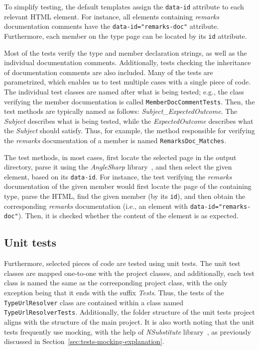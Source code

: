To simplify testing, the default templates assign the \texttt{data-id} attribute to each relevant HTML element.
For instance, all elements containing \textit{remarks} documentation comments have the \texttt{data-id="remarks-doc"} attribute.
Furthermore, each member on the type page can be located by its \texttt{id} attribute.

Most of the tests verify the type and member declaration strings, as well as the individual documentation comments.
Additionally, tests checking the inheritance of documentation comments are also included.
Many of the tests are parametrized, which enables us to test multiple cases with a single piece of code.
The individual test classes are named after what is being tested; e.g., the class verifying the member documentation is called \texttt{MemberDocCommentTests}.
Then, the test methods are typically named as follows: \textit{Subject\_ExpectedOutcome}.
The \textit{Subject} describes what is being tested, while the \textit{ExpectedOutcome} describes what the \textit{Subject} should satisfy.
Thus, for example, the method responsible for verifying the \textit{remarks} documentation of a member is named \texttt{RemarksDoc\_Matches}.

The test methods, in most cases, first locate the selected page in the output directory, parse it using the \textit{AngleSharp} library~\cite{anglesharp}, and then select the given element, based on its \texttt{data-id}.
For instance, the test verifying the \textit{remarks} documentation of the given member would first locate the page of the containing type, parse the HTML, find the given member (by its \texttt{id}), and then obtain the corresponding \textit{remarks} documentation (i.e., an element with \texttt{data-id="remarks-doc"}).
Then, it is checked whether the content of the element is as expected.

\subsection{Unit tests}

Furthermore, selected pieces of code are tested using unit tests.
The unit test classes are mapped one-to-one with the project classes, and additionally, each test class is named the same as the corresponding project class, with the only exception being that it ends with the suffix \textit{Tests}.
Thus, the tests of the \texttt{TypeUrlResolver} class are contained within a class named \texttt{TypeUrlResolverTests}.
Additionally, the folder structure of the unit tests project aligns with the structure of the main project.
It is also worth noting that the unit tests frequently use mocking, with the help of \textit{NSubstitute} library~\cite{nsub}, as previously discussed in Section~\ref{sec:tests-mocking-explanation}.

